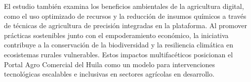 El estudio también examina los beneficios ambientales de la agricultura digital, como el uso optimizado de recursos y la reducción de insumos químicos a través de técnicas de agricultura de precisión integradas en la plataforma. Al promover prácticas sostenibles junto con el empoderamiento económico, la iniciativa contribuye a la conservación de la biodiversidad y la resiliencia climática en ecosistemas rurales vulnerables. Estos impactos multifacéticos posicionan el Portal Agro Comercial del Huila como un modelo para intervenciones tecnológicas escalables e inclusivas en sectores agrícolas en desarrollo.